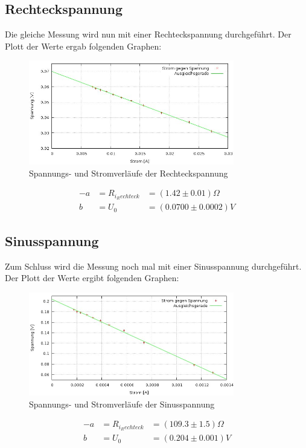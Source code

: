 \subsection{Rechteckspannung}
Die gleiche Messung wird nun mit einer Rechteckspannung durchgeführt. Der Plott der Werte ergab folgenden Graphen:
\begin{figure}[htbp]
\includegraphics[width=0.8\textwidth]{pics/rechteck.jpeg}
\caption{Spannungs- und Stromverläufe der Rechteckspannung}
\end{figure}
\begin{align*}
-a &= R_{i_Rechteck}               &= (1.42  \pm 0.01) \Omega\\
b &= U_0 &= (0.0700  \pm 0.0002) V
\end{align*}

\subsection{Sinusspannung}
Zum Schluss wird die Messung noch mal mit einer Sinusspannung durchgeführt. Der Plott der Werte ergibt folgenden Graphen:
\begin{figure}
\includegraphics[width=0.8\textwidth]{pics/sinus.jpeg}
\caption{Spannungs- und Stromverläufe der Sinusspannung}
\end{figure}
\begin{align*}
-a &= R_{i_Rechteck}               &= (109.3    \pm 1.5) \Omega\\
b &= U_0 &= (0.204       \pm 0.001) V
\end{align*}

